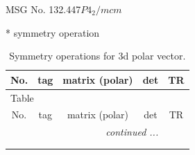 \documentclass[fleqn,8pt]{jsarticle}
\begin{document}
\setcounter{MaxMatrixCols}{32}

\renewcommand{\tablename}{Table~}
\renewcommand{\figurename}{Figure~}
\begin{center}
\LARGE
MSG No. 132.447\quad$P4_{2}/mcm$
\end{center}
* symmetry operation
\renewcommand{\arraystretch}{1.3}
\begin{longtable}{ccccc}
\caption{Symmetry operations for 3d polar vector.}
 \\
 \hline \hline
No. & tag & matrix (polar) & det & TR \\ \hline \endfirsthead

\multicolumn{4}{l}{\tablename\ \thetable{}} \\
 \hline \hline
No. & tag & matrix (polar) & det & TR \\ \hline \endhead

 \hline \hline
\multicolumn{4}{r}{\footnotesize\it continued ...} \\ \endfoot

 \hline \hline
\multicolumn{4}{r}{} \\ \endlastfoot


\end{longtable}
\end{document}
